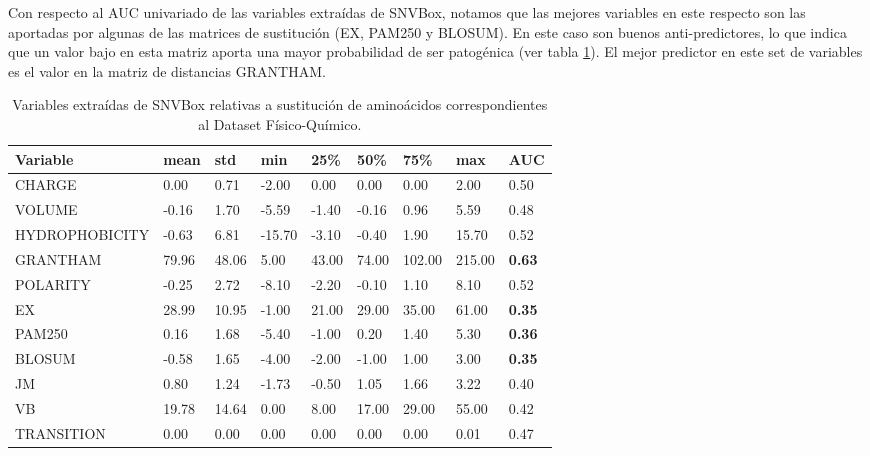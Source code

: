 
Con respecto al AUC univariado de las variables extraídas de SNVBox, notamos que las mejores variables en este respecto son las aportadas por algunas de las matrices de sustitución (EX, PAM250 y BLOSUM). En este caso son buenos anti-predictores, lo que indica que un valor bajo en esta matriz aporta una mayor probabilidad de ser patogénica (ver tabla \ref{tab:snvbox_amino}). El mejor predictor en este set de variables es el valor en la matriz de distancias GRANTHAM.  



\begin{table}[H]
\centering
\begin{tabular}{|l|l|l|l|l|l|l|l|l|}
\hline
Variable & mean   & std    & min    & 25\%  & 50\%   & 75\% & max & AUC    \\ \hline
CHARGE            & 0.00  & 0.71   & -2.00  & 0.00  & 0.00   & 0.00 & 2.00 & 0.50   \\ \hline
VOLUME            & -0.16  & 1.70   & -5.59  & -1.40 & -0.16  & 0.96 & 5.59 & 0.48   \\ \hline
HYDROPHOBICITY    & -0.63  & 6.81   & -15.70 & -3.10 & -0.40  & 1.90 & 15.70 & 0.52  \\ \hline
GRANTHAM          & 79.96  & 48.06  & 5.00   & 43.00 & 74.00  & 102.00 & 215.00 &  \textbf{0.63} \\ \hline
POLARITY          & -0.25  & 2.72   & -8.10  & -2.20 & -0.10  & 1.10   & 8.10 & 0.52   \\ \hline
EX                & 28.99  & 10.95  & -1.00  & 21.00 & 29.00  & 35.00  & 61.00 & \textbf{0.35}  \\ \hline
PAM250            & 0.16   & 1.68   & -5.40  & -1.00 & 0.20   & 1.40   & 5.30 & \textbf{0.36}   \\ \hline
BLOSUM            & -0.58  & 1.65   & -4.00  & -2.00 & -1.00  & 1.00   & 3.00 & \textbf{0.35}   \\ \hline
JM                & 0.80   & 1.24   & -1.73  & -0.50 & 1.05   & 1.66   & 3.22 & 0.40   \\ \hline
VB                & 19.78  & 14.64  & 0.00   & 8.00  & 17.00  & 29.00  & 55.00 & 0.42  \\ \hline
TRANSITION        & 0.00   & 0.00   & 0.00   & 0.00  & 0.00   & 0.00   & 0.01 & 0.47   \\ \hline
\end{tabular}
\caption{Variables extraídas de SNVBox relativas a sustitución de aminoácidos correspondientes al Dataset Físico-Químico.}
\label{tab:snvbox_amino}

\end{table}

